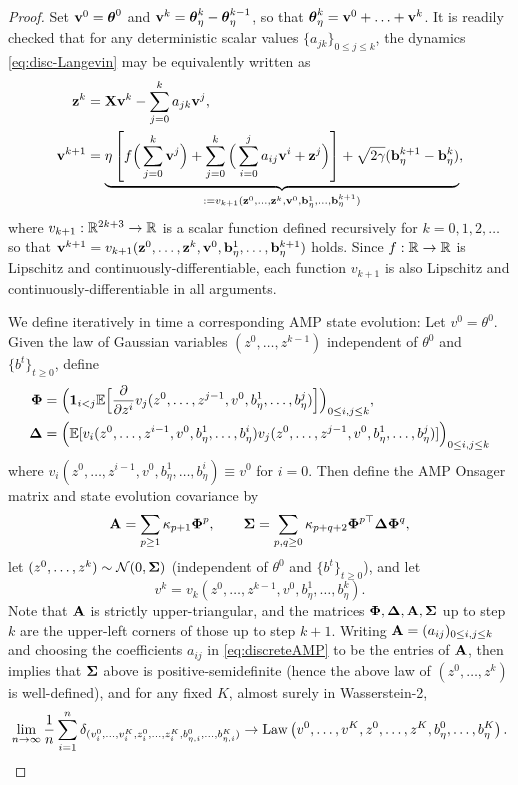 \begin{proof}
Set $\mathbf{v}^0=\boldsymbol{\theta}^0$ and $\mathbf{v}^k=\boldsymbol{\theta}^{k}_\eta-\boldsymbol{\theta}^{k-1}_\eta$, so that
$\boldsymbol{\theta}^{k}_\eta=\mathbf{v}^0+\ldots+\mathbf{v}^k$. 
It is readily checked that for any deterministic scalar
values $\{a_{jk}\}_{0 \leq j \leq k}$,
the dynamics \eqref{eq:disc-Langevin} may be equivalently written as
\begin{equation}\label{eq:discreteAMP}
\begin{aligned}
\mathbf{z}^k&=\mathbf{X}\mathbf{v}^k-\sum_{j=0}^k a_{jk}\mathbf{v}^j,\\
\mathbf{v}^{k+1}&=\underbrace{\eta\left[f\Big(\sum_{j=0}^k \mathbf{v}^j\Big)+\sum_{j=0}^k
\Big(\sum_{i=0}^j a_{ij}\mathbf{v}^i+\mathbf{z}^j\Big)\right] +
\sqrt{2\gamma}(\mathbf{b}_\eta^{k+1}-\mathbf{b}_\eta^k)}_{:=v_{k+1}(\mathbf{z}^0,\ldots,\mathbf{z}^k,\mathbf{v}^0,\mathbf{b}_\eta^1,\ldots,\mathbf{b}_\eta^{k+1})},
\end{aligned}
\end{equation}
where $v_{k+1}:\mathbb{R}^{2k+3} \to \mathbb{R}$ is a scalar function defined recursively for
$k=0,1,2,\ldots$ so that
$\mathbf{v}^{k+1}=v_{k+1}(\mathbf{z}^0,\ldots,\mathbf{z}^k,\mathbf{v}^0,\mathbf{b}_\eta^1,\ldots,\mathbf{b}_\eta^{k+1})$ holds.
Since $f:\mathbb{R} \to \mathbb{R}$ is Lipschitz and continuously-differentiable,
each function $v_{k+1}$ is also Lipschitz and continuously-differentiable
in all arguments.

We define iteratively in time a corresponding AMP state evolution:
Let $v^0=\theta^0$. Given the law of Gaussian variables $(z^0,\ldots,z^{k-1})$
independent of $\theta^0$ and $\{b^t\}_{t \geq 0}$, define
\begin{align*}
\boldsymbol{\Phi}
&=\Big(\mathbf{1}_{i<j}\mathbb{E}\Big[
\frac{\partial}{\partial z^i}
v_j(z^0,\ldots,z^{j-1},v^0,b_\eta^1,\ldots,b_\eta^j)
\Big]
\Big)_{0 \leq i,j \leq k},\\
\boldsymbol{\Delta}
&=\Big(
\mathbb{E}[
v_i(z^0,\ldots,z^{i-1},v^0,b_\eta^1,\ldots,b_\eta^i)
v_j(z^0,\ldots,z^{j-1},v^0,b_\eta^1,\ldots,b_\eta^j)]
\Big)_{0 \leq i,j \leq k}
\end{align*}
where $v_i(z^0,\ldots,z^{i-1},v^0,b_\eta^1,\ldots,b_\eta^i) \equiv v^0$ for
$i=0$. Then define the AMP Onsager matrix and state evolution covariance by
\[
\mathbf{A}=\sum_{p \geq 1} \kappa_{p+1}\boldsymbol{\Phi}^p,
\qquad
\boldsymbol{\Sigma}=\sum_{p,q \geq 0} \kappa_{p+q+2}
\boldsymbol{\Phi}^{p\top}\boldsymbol{\Delta}\boldsymbol{\Phi}^q,
\]
let $(z^0,\ldots,z^k) \sim \mathcal{N}(0,\boldsymbol{\Sigma})$ (independent of $\theta^0$ and
$\{b^t\}_{t \geq 0}$), and let
\begin{equation}\label{eq:vkdef}
v^k=v_k(z^0,\ldots,z^{k-1},v^0,b_\eta^1,\ldots,b_\eta^k).
\end{equation}
Note that $\mathbf{A}$ is strictly upper-triangular, and the matrices
$\boldsymbol{\Phi},\boldsymbol{\Delta},\mathbf{A},\boldsymbol{\Sigma}$ up to step $k$ are the upper-left corners of those up
to step $k+1$.
Writing $\mathbf{A}=(a_{ij})_{0 \leq i,j \leq k}$ and choosing the
coefficients $a_{ij}$ in \eqref{eq:discreteAMP} to be the entries of $\mathbf{A}$,
\cite[Theorem 4.3]{fan2022approximate} then implies that $\boldsymbol{\Sigma}$
above is positive-semidefinite (hence the above law of $(z^0,\ldots,z^k)$
is well-defined), and for any fixed $K$, almost surely in Wasserstein-2,
\begin{align}\label{eq:AMPconvergence}
\lim_{n \to \infty}
\frac{1}{n}\sum_{i=1}^n
\delta_{(v_i^0,\ldots,v_i^K,z_i^0,\ldots,z_i^K,b_{\eta,i}^0,\ldots,b_{\eta,i}^K)}
\to 
\operatorname{Law}\left(v^0,\ldots,v^K,z^0,\ldots,z^K,b_\eta^0,\ldots,b_\eta^K\right).
\end{align}


\end{proof}
